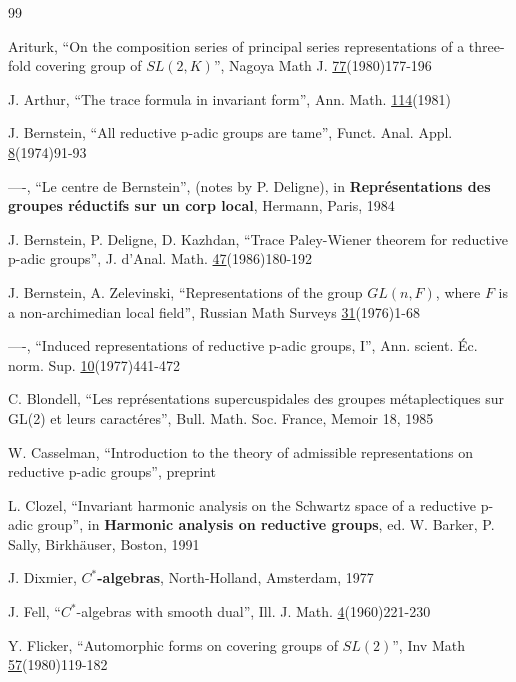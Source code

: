 \begin{thebibliography}{99}

  Ariturk, ``On the composition series of principal series
representations of a three-fold covering group of $SL(2,K)$'', Nagoya Math
J. \underline{77}(1980)177-196

  J. Arthur, ``The trace formula in invariant form'', Ann. Math. 
\underline{114}(1981)

  J. Bernstein, ``All reductive p-adic groups are tame'', Funct. Anal.
Appl. \underline{8}(1974)91-93

  ----, ``Le centre de Bernstein'', (notes by P. Deligne), in
  {\bf Repr\'esentations des groupes r\'eductifs sur un corp local},
Hermann, Paris, 1984

  J. Bernstein, P. Deligne, D. Kazhdan, ``Trace Paley-Wiener theorem for
reductive p-adic groups'', J. d'Anal. Math. \underline{47}(1986)180-192

  J. Bernstein, A. Zelevinski, ``Representations of the group $GL(n,F)$,
where $F$ is a non-archimedian local field'', Russian Math Surveys 
\underline{31}(1976)1-68

  ----, ``Induced representations of reductive p-adic groups, I'', Ann.
scient. \'Ec. norm. Sup. \underline{10}(1977)441-472

  C. Blondell, ``Les repr\'esentations supercuspidales 
  des groupes m\'etaplectiques sur GL(2) et leurs caract\'eres'',
  Bull. Math. Soc. France, Memoir 18, 1985

  W. Casselman, ``Introduction to the theory of admissible
representations on reductive p-adic groups'', preprint

  L. Clozel, ``Invariant harmonic analysis on the Schwartz space of a
reductive p-adic group'', in {\bf Harmonic analysis on reductive groups}, ed. W. Barker, P.
Sally, Birkh\"auser, Boston, 1991

  J. Dixmier, {\bf $C^{*}$-algebras}, North-Holland, Amsterdam, 1977

  J. Fell, ``$C^{*}$-algebras with smooth dual'', Ill. J. Math. \underline{%
4}(1960)221-230

  Y. Flicker, ``Automorphic forms on covering groups of $SL(2)$'', Inv
Math \underline{57}(1980)119-182


\end{thebibliography}
